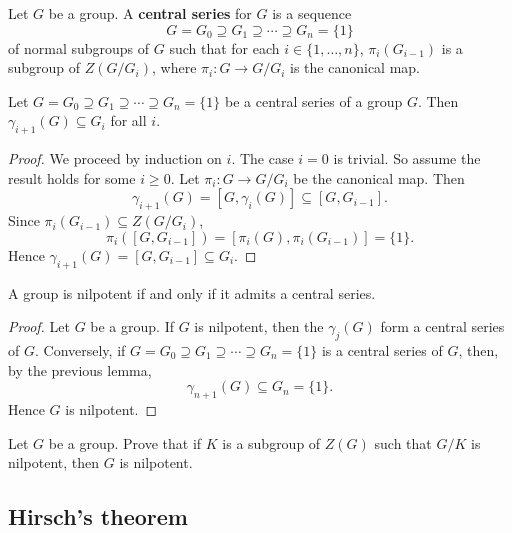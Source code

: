 \begin{definition}
Let $G$ be a group. A \textbf{central series} for $G$ 
is a sequence 
	\[
		G=G_0\supseteq G_1\supseteq\cdots\supseteq G_n=\{1\}
	\]
of normal subgroups of $G$ such that 
for each $i\in\{1,\dots,n\}$, 
$\pi_i(G_{i-1})$ is a subgroup of $Z(G/G_i)$, where  $\pi_i\colon G\to
G/G_i$ is the canonical map.
\end{definition}

\begin{lemma}
\label{lem:central_series}
Let $G=G_0\supseteq G_1\supseteq\cdots\supseteq G_n=\{1\}$ be 
a central series of a group $G$. Then $\gamma_{i+1}(G)\subseteq G_i$ for all $i$.
\end{lemma}

\begin{proof}
We proceed by induction on $i$. The case $i=0$ is trivial. So assume the result holds for some
$i\geq0$. Let  
	$\pi_i\colon G\to
	G/G_i$ be the canonical map. 
	Then  
	\[
	\gamma_{i+1}(G)=[G,\gamma_i(G)]\subseteq [G,G_{i-1}].
	\]
	Since $\pi_i(G_{i-1})\subseteq Z(G/G_{i})$, 
	\[
        \pi_i([G,G_{i-1}])=[\pi_i(G),\pi_i(G_{i-1})]=\{1\}.
        \]
        Hence $\gamma_{i+1}(G)=[G,G_{i-1}]\subseteq G_i$. 
\end{proof}


\begin{theorem}
A group is nilpotent if and only if it admits a central series. 
\end{theorem}

\begin{proof}
Let $G$ be a group. If $G$ is nilpotent, then the $\gamma_j(G)$ form a central series of 
$G$. Conversely, if $G=G_0\supseteq
G_1\supseteq\cdots\supseteq G_n=\{1\}$ is a central series of $G$, 
then, by the previous lemma,  
	\[
	\gamma_{n+1}(G)\subseteq G_n=\{1\}.
	\]
Hence $G$ is nilpotent. 
\end{proof}

\begin{exercise}
\label{xca:nilpotent_central}
Let $G$ be a group. Prove that if $K$ is a subgroup of $Z(G)$ such that 
$G/K$ is nilpotent, then $G$ is nilpotent. 
\end{exercise}

\subsection{Hirsch's theorem}

